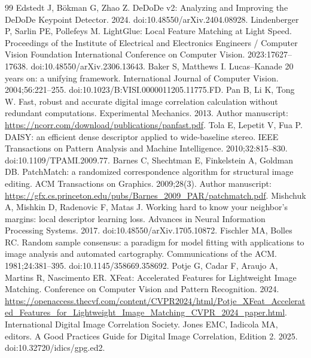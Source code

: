 \begin{thebibliography}{99}
 Edstedt J, B\"okman G, Zhao Z. DeDoDe v2: Analyzing and Improving the DeDoDe Keypoint Detector. 2024. doi:10.48550/arXiv.2404.08928.
 Lindenberger P, Sarlin PE, Pollefeys M. LightGlue: Local Feature Matching at Light Speed. Proceedings of the Institute of Electrical and Electronics Engineers / Computer Vision Foundation International Conference on Computer Vision. 2023:17627--17638. doi:10.48550/arXiv.2306.13643.
 Baker S, Matthews I. Lucas--Kanade 20 years on: a unifying framework. International Journal of Computer Vision. 2004;56:221--255. doi:10.1023/B:VISI.0000011205.11775.FD.
 Pan B, Li K, Tong W. Fast, robust and accurate digital image correlation calculation without redundant computations. Experimental Mechanics. 2013. Author manuscript: \url{https://ncorr.com/download/publications/panfast.pdf}.
 Tola E, Lepetit V, Fua P. DAISY: an efficient dense descriptor applied to wide-baseline stereo. IEEE Transactions on Pattern Analysis and Machine Intelligence. 2010;32:815--830. doi:10.1109/TPAMI.2009.77.
 Barnes C, Shechtman E, Finkelstein A, Goldman DB. PatchMatch: a randomized correspondence algorithm for structural image editing. ACM Transactions on Graphics. 2009;28(3). Author manuscript: \url{https://gfx.cs.princeton.edu/pubs/Barnes_2009_PAR/patchmatch.pdf}.
 Mishchuk A, Mishkin D, Radenovic F, Matas J. Working hard to know your neighbor's margins: local descriptor learning loss. Advances in Neural Information Processing Systems. 2017. doi:10.48550/arXiv.1705.10872.
 Fischler MA, Bolles RC. Random sample consensus: a paradigm for model fitting with applications to image analysis and automated cartography. Communications of the ACM. 1981;24:381--395. doi:10.1145/358669.358692.
 Potje G, Cadar F, Araujo A, Martins R, Nascimento ER. XFeat: Accelerated Features for Lightweight Image Matching. Conference on Computer Vision and Pattern Recognition. 2024. \url{https://openaccess.thecvf.com/content/CVPR2024/html/Potje_XFeat_Accelerated_Features_for_Lightweight_Image_Matching_CVPR_2024_paper.html}.
 International Digital Image Correlation Society. Jones EMC, Iadicola MA, editors. A Good Practices Guide for Digital Image Correlation, Edition 2. 2025. doi:10.32720/idics/gpg.ed2.
\end{thebibliography}
